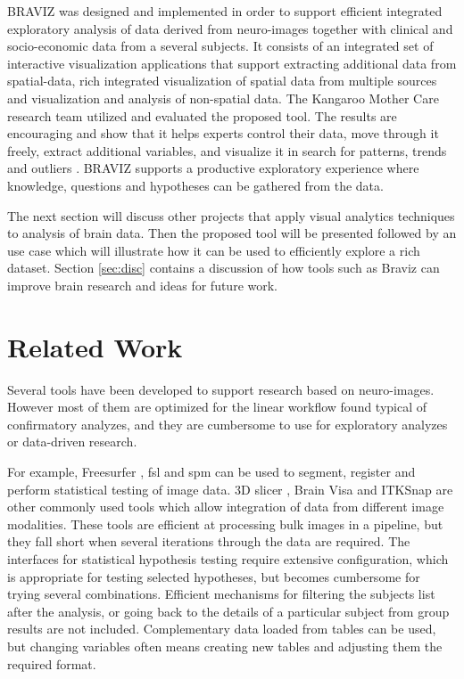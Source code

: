 \documentclass[utf8,paper]{frontiersSCNS} %
\begin{document}
BRAVIZ was designed and implemented in order to support efficient integrated exploratory analysis of data derived from neuro-images together with clinical and socio-economic data from a several subjects. It consists of an integrated set of interactive visualization applications that support extracting additional data from spatial-data, rich integrated visualization of spatial data from multiple sources and visualization and analysis of non-spatial data.
The Kangaroo Mother Care research team utilized and evaluated the proposed tool. The results are  encouraging and show that it helps experts control their data, move through it freely, extract additional variables, and visualize it in search for patterns, trends and outliers . BRAVIZ supports a productive exploratory experience where knowledge, questions and hypotheses can be gathered from the data.

The next section will discuss other projects that apply visual analytics techniques to analysis of brain data. Then the proposed tool will be presented followed by an use case which will illustrate how it can be used to efficiently explore a rich dataset. Section \ref{sec:disc} contains a discussion of how tools such as Braviz can improve brain research and ideas for future work.


\section{Related Work}

Several tools have been developed to support research based on neuro-images. However most of them are optimized for the linear workflow found typical of confirmatory analyzes, and they are cumbersome to use for exploratory analyzes or data-driven research.

For example, Freesurfer  \citep{fischl_freesurfer_2012}, fsl\citep{jenkinson_fsl_2012} and spm \citep{friston_statistical_2006} can be used to segment, register and perform statistical testing of image data. 3D slicer \citep{fedorov_3d_2012}, Brain Visa \citep{cointepas_brainvisa:_2001} and ITKSnap \citep{yushkevich_user-guided_2006} are other commonly used tools which allow integration of data from different image modalities. These tools are efficient at processing bulk images in a pipeline, but they fall short when several iterations through the data are required. The interfaces for statistical hypothesis testing require extensive configuration, which is appropriate for testing selected hypotheses, but becomes cumbersome for trying several combinations. Efficient mechanisms for filtering the subjects list after the analysis, or going back to the details of a particular subject from group results are not included. Complementary data loaded from tables can be used, but changing variables often means creating new tables and adjusting them the required format.
\end{document}
